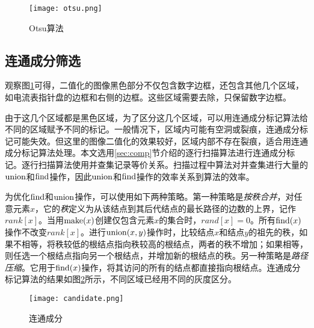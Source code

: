 \begin{figure}[h]
  \centering
  \texttt{[image: otsu.png]}
  \caption{Otsu算法}
  \label{fig:otsu}
\end{figure}


\subsection{连通成分筛选}

观察图\ref{fig:otsu}可得，二值化的图像黑色部分不仅包含数字边框，还包含其他几个区域，如电流表指针盘的边框和右侧的边框。这些区域需要去除，只保留数字边框。


由于这几个区域都是黑色区域，为了区分这几个区域，可以用连通成分标记算法给不同的区域赋予不同的标记。一般情况下，区域内可能有空洞或裂痕，连通成分标记可能失效。但这里的图像二值化的效果较好，区域内部不存在裂痕，适合用连通成分标记算法处理。本文选用\ref{sec:comp}节介绍的逐行扫描算法进行连通成分标记。逐行扫描算法使用并查集记录等价关系。扫描过程中算法对并查集进行大量的$\operatorname{union}$和$\operatorname{find}$操作，因此$\operatorname{union}$和$\operatorname{find}$操作的效率关系到算法的效率。

为优化$\operatorname{find}$和$\operatorname{union}$操作，可以使用如下两种策略。第一种策略是\emph{按秩合并}，对任意元素$x$，它的\emph{秩}定义为从该结点到其后代结点的最长路径的边数的上界，记作$rank[x]$。当用$\operatorname{make}(x)$创建仅包含元素$x$的集合时，$rand[x]=0$。所有$\operatorname{find}(x)$操作不改变$rank[x]$。进行$\operatorname{union}(x,y)$操作时，比较结点$x$和结点$y$的祖先的秩，如果不相等，将秩较低的根结点指向秩较高的根结点，两者的秩不增加；如果相等，则任选一个根结点指向另一个根结点，并增加新的根结点的秩。另一种策略是\emph{路径压缩}。它用于$\operatorname{find}(x)$操作，将其访问的所有的结点都直接指向根结点。连通成分标记算法的结果如图\ref{fig:candidate}所示，不同区域已经用不同的灰度区分。



\begin{figure}[h]
  \centering
  \texttt{[image: candidate.png]}
  \caption{连通成分}
  \label{fig:candidate}
\end{figure}


